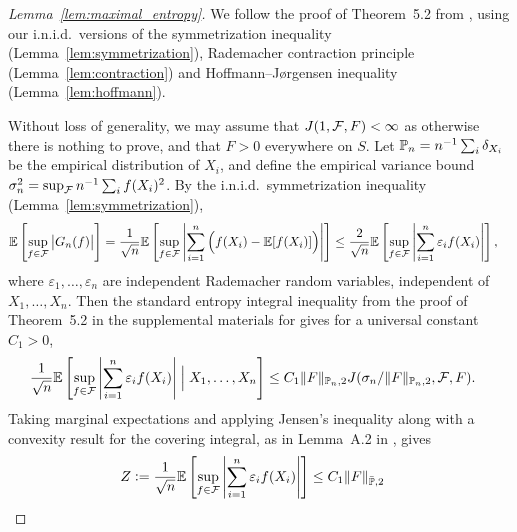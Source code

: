 \begin{proof}[Lemma~\ref{lem:maximal_entropy}]

  We follow the proof of Theorem~5.2
  from \citet{chernozhukov2014gaussian},
  using our i.n.i.d.\ versions of the symmetrization inequality
  (Lemma~\ref{lem:symmetrization}),
  Rademacher contraction principle
  (Lemma~\ref{lem:contraction})
  and Hoffmann--J{\o}rgensen inequality
  (Lemma~\ref{lem:hoffmann}).

  Without loss of generality,
  we may assume that $J(1, \cF, F) < \infty$
  as otherwise there is nothing to prove,
  and that $F > 0$ everywhere on $S$.
  Let $\P_n = n^{-1} \sum_i \delta_{X_i}$
  be the empirical distribution
  of $X_i$,
  and define the empirical variance bound
  $\sigma_n^2 = \sup_\cF n^{-1} \sum_i f(X_i)^2$.
  By the i.n.i.d.\ symmetrization inequality
  (Lemma~\ref{lem:symmetrization}),
  \begin{align*}
    \E \left[
      \sup_{f \in \cF}
      \big| G_n(f) \big|
    \right]
    &=
    \frac{1}{\sqrt n}
    \E \left[
      \sup_{f \in \cF}
      \left|
      \sum_{i=1}^n
      \Big(
        f(X_i)
        - \E[f(X_i)]
      \Big)
      \right|
    \right]
    \leq
    \frac{2}{\sqrt n}
    \E \left[
      \sup_{f \in \cF}
      \left|
      \sum_{i=1}^n
      \varepsilon_i
      f(X_i)
      \right|
    \right],
  \end{align*}
  where $\varepsilon_1, \ldots, \varepsilon_n$
  are independent Rademacher random variables,
  independent of $X_1, \ldots, X_n$.
  Then the standard entropy integral inequality
  from the proof of Theorem~5.2 in
  the supplemental materials for
  \citet{chernozhukov2014gaussian}
  gives for a universal constant $C_1 > 0$,
  \begin{align*}
    \frac{1}{\sqrt n}
    \E \left[
      \sup_{f \in \cF}
      \left|
      \sum_{i=1}^n
      \varepsilon_i
      f(X_i)
      \right|
      \Bigm\vert
      X_1, \ldots, X_n
    \right]
    &\leq
    C_1 \|F\|_{\P_n,2}
    J(\sigma_n / \|F\|_{\P_n,2}, \cF, F).
  \end{align*}
  Taking marginal expectations
  and applying Jensen's inequality along with
  a convexity result for the covering integral,
  as in Lemma~A.2 in \citet{chernozhukov2014gaussian},
  gives
  \begin{align*}
    Z
    &\vcentcolon=
    \frac{1}{\sqrt n}
    \E \left[
      \sup_{f \in \cF}
      \left|
      \sum_{i=1}^n
      \varepsilon_i
      f(X_i)
      \right|
    \right]
    \leq
    C_1 \|F\|_{\bar\P,2}

\end{align*}
\end{proof}
